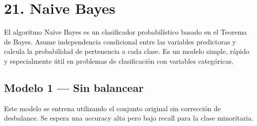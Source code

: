 \documentclass[
]{article}
\begin{document}
\section{21. Naive Bayes}\label{naive-bayes}

El algoritmo Naive Bayes es un clasificador probabilístico basado en el
Teorema de Bayes. Asume independencia condicional entre las variables
predictoras y calcula la probabilidad de pertenencia a cada clase. Es un
modelo simple, rápido y especialmente útil en problemas de clasificación
con variables categóricas.

\subsection{Modelo 1 --- Sin balancear}\label{modelo-1-sin-balancear}

Este modelo se entrena utilizando el conjunto original sin corrección de
desbalance. Se espera una accuracy alta pero bajo recall para la clase
minoritaria.
\end{document}
